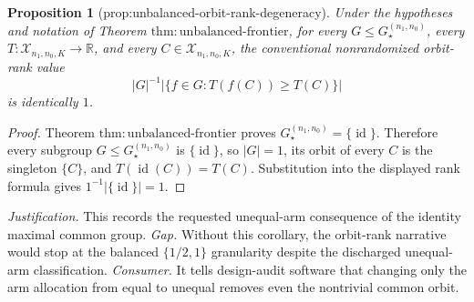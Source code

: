 \documentclass{article}
\newtheorem{proposition}{Proposition}
\begin{document}
\begin{proposition}[prop:unbalanced-orbit-rank-degeneracy]\label{prop:unbalanced-orbit-rank-degeneracy}
Under the hypotheses and notation of Theorem \(\mathrm{thm{:}unbalanced\text{-}frontier}\), for every \(G\leq G_\star^{(n_1,n_0)}\), every \(T:\mathcal X_{n_1,n_0,K}\to\mathbb R\), and every \(C\in\mathcal X_{n_1,n_0,K}\), the conventional nonrandomized orbit-rank value
\[
 |G|^{-1}\bigl|\{f\in G:T(f(C))\geq T(C)\}\bigr|
\]
is identically \(1\).
\end{proposition}
\begin{proof}
Theorem \(\mathrm{thm{:}unbalanced\text{-}frontier}\) proves \(G_\star^{(n_1,n_0)}=\{\operatorname{id}\}\). Therefore every subgroup \(G\leq G_\star^{(n_1,n_0)}\) is \(\{\operatorname{id}\}\), so \(|G|=1\), its orbit of every \(C\) is the singleton \(\{C\}\), and \(T(\operatorname{id}(C))=T(C)\). Substitution into the displayed rank formula gives \(1^{-1}|\{\operatorname{id}\}|=1\).
\end{proof}
\par\smallskip\noindent \textit{Justification.} This records the requested unequal-arm consequence of the identity maximal common group. \textit{Gap.} Without this corollary, the orbit-rank narrative would stop at the balanced \(\{1/2,1\}\) granularity despite the discharged unequal-arm classification. \textit{Consumer.} It tells design-audit software that changing only the arm allocation from equal to unequal removes even the nontrivial common orbit.
\end{document}
